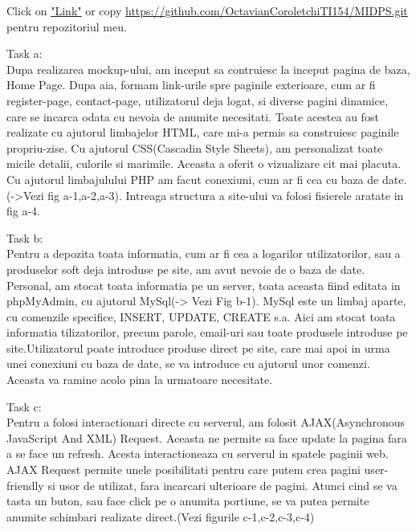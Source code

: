 Click on \href{https://github.com/OctavianCoroletchiTI154/MIDPS.git}{"Link"} or copy \url{https://github.com/OctavianCoroletchiTI154/MIDPS.git} pentru repozitoriul meu.
\par Task a: \\
Dupa realizarea mockup-ului, am inceput sa contruiesc la inceput pagina de baza, Home Page. Dupa aia, formam link-urile spre paginile exterioare, cum ar fi register-page, contact-page, utilizatorul deja logat, si diverse pagini dinamice, care se incarca odata cu nevoia de anumite necesitati. Toate acestea au fost realizate cu ajutorul limbajelor HTML, care mi-a permis sa construiesc paginile propriu-zise. Cu ajutorul CSS(Cascadin Style Sheets), am personalizat toate micile detalii, culorile si marimile. Aceasta a oferit o vizualizare cit mai placuta. Cu ajutorul limbajulului PHP am facut conexiuni, cum ar fi cea cu baza de date.(->Vezi fig a-1,a-2,a-3). Intreaga structura a site-ului va folosi fisierele aratate in fig a-4.\\
\clearpage
\par Task b: \\
Pentru a depozita toata informatia, cum ar fi cea a logarilor utilizatorilor, sau a produselor soft deja introduse pe site, am avut nevoie de o baza de date. Personal, am stocat toata informatia pe un server, toata aceasta fiind editata in phpMyAdmin, cu ajutorul MySql(-> Vezi Fig b-1). MySql este un limbaj aparte, cu comenzile specifice, INSERT, UPDATE, CREATE s.a. Aici am stocat toata informatia tilizatorilor, precum parole, email-uri sau toate produsele introduse pe site.Utilizatorul poate introduce produse direct pe site, care mai apoi in urma unei conexiuni cu baza de date, se va introduce cu ajutorul unor comenzi. Aceasta va ramine acolo pina la urmatoare necesitate.\\
\par Task c:\\
Pentru a folosi interactionari directe cu serverul, am folosit AJAX(Asynchronous JavaScript And XML) Request. Aceasta ne permite sa face update la pagina fara a se face un refresh. Acesta interactioneaza cu serverul in spatele paginii web. AJAX Request permite unele posibilitati pentru care putem crea pagini user-friendly si usor de utilizat, fara incarcari ulterioare de pagini. Atunci cind se va tasta un buton, sau face click pe o anumita portiune, se va putea permite anumite schimbari realizate direct.(Vezi figurile c-1,c-2,c-3,c-4)\\

